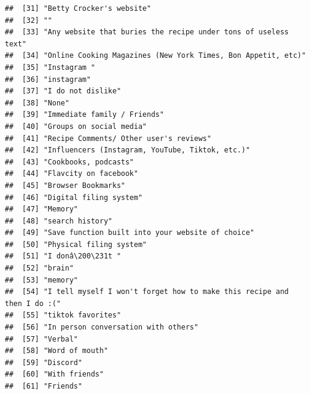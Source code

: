 \documentclass[
]{article}
\begin{document}
\begin{verbatim}
##  [31] "Betty Crocker's website"                                                  
##  [32] ""                                                                         
##  [33] "Any website that buries the recipe under tons of useless text"            
##  [34] "Online Cooking Magazines (New York Times, Bon Appetit, etc)"              
##  [35] "Instagram "                                                               
##  [36] "instagram"                                                                
##  [37] "I do not dislike"                                                         
##  [38] "None"                                                                     
##  [39] "Immediate family / Friends"                                               
##  [40] "Groups on social media"                                                   
##  [41] "Recipe Comments/ Other user's reviews"                                    
##  [42] "Influencers (Instagram, YouTube, Tiktok, etc.)"                           
##  [43] "Cookbooks, podcasts"                                                      
##  [44] "Flavcity on facebook"                                                     
##  [45] "Browser Bookmarks"                                                        
##  [46] "Digital filing system"                                                    
##  [47] "Memory"                                                                   
##  [48] "search history"                                                           
##  [49] "Save function built into your website of choice"                          
##  [50] "Physical filing system"                                                   
##  [51] "I donâ\200\231t "                                                               
##  [52] "brain"                                                                    
##  [53] "memory"                                                                   
##  [54] "I tell myself I won't forget how to make this recipe and then I do :("    
##  [55] "tiktok favorites"                                                         
##  [56] "In person conversation with others"                                       
##  [57] "Verbal"                                                                   
##  [58] "Word of mouth"                                                            
##  [59] "Discord"                                                                  
##  [60] "With friends"                                                             
##  [61] "Friends"                                                                  

\end{verbatim}
\end{document}
